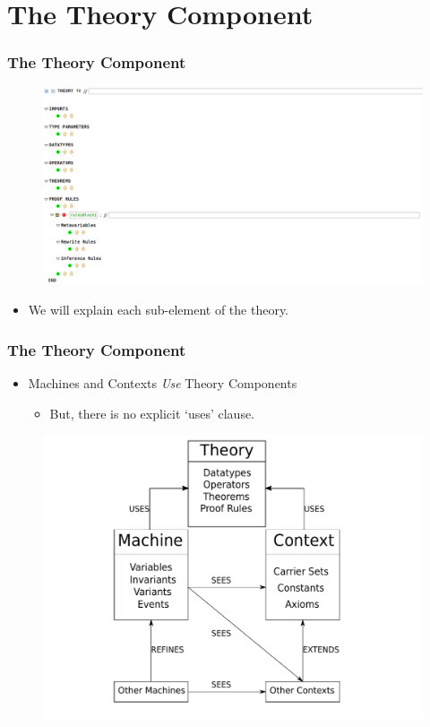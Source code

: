 \documentclass{beamer}
\begin{document}
\section{The Theory Component}
	\begin{frame}
		\frametitle{The Theory Component}
		\begin{figure}
			\includegraphics[scale=0.3]{Theory}
		\end{figure}
		\begin{itemize}
			\item We will explain each sub-element of the theory.
		\end{itemize}
	\end{frame}
	\begin{frame}
		\frametitle{The Theory Component}
		\begin{itemize}
			\item Machines and Contexts \emph{Use} Theory Components
			\begin{itemize}
				\item But, there is no explicit `uses' clause.
			\end{itemize}
		\end{itemize}
		\begin{figure}
			\includegraphics[scale=0.4]{NewComponents}
		\end{figure}
	\end{frame}
\end{document}

